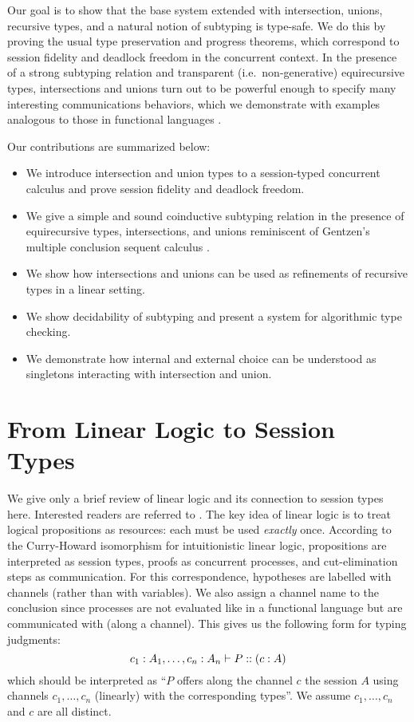 \documentclass[submission,copyright,creativecommons]{eptcs}
\begin{document}
Our goal is to show that the base system extended with intersection, unions, recursive types, and a natural notion of subtyping is type-safe. We do this by proving the usual type preservation and progress theorems, which correspond to session fidelity and deadlock freedom in the concurrent context. In the presence of a strong subtyping relation and transparent (i.e.\ non-generative)  equirecursive types, intersections and unions turn out to be powerful enough to specify many interesting communications behaviors, which we demonstrate with examples analogous to those in functional languages \cite{FreemanP91,Dunfield03}.

Our contributions are summarized below:
\begin{itemize}
  \item We introduce intersection and union types to a session-typed concurrent calculus and prove session fidelity and deadlock freedom.
  \item We give a simple and sound coinductive subtyping relation in the presence of equirecursive types, intersections, and unions reminiscent of Gentzen's multiple conclusion sequent calculus \cite{Gentzen35, Girard87}.
  \item We show how intersections and unions can be used as refinements of recursive types in a linear setting.
  \item We show decidability of subtyping and present a system for algorithmic type checking.
  \item We demonstrate how internal and external choice can be understood as singletons interacting with intersection and union.
\end{itemize}


\section{From Linear Logic to Session Types}
\label{base}
We give only a brief review of linear logic and its connection to session types here. Interested readers are referred to \cite{CairesP10, PfenningG15, Honda93}. The key idea of linear logic is to treat logical propositions as resources: each must be used \emph{exactly} once. According to the Curry-Howard isomorphism for intuitionistic linear logic, propositions are interpreted as session types, proofs as concurrent processes, and cut-elimination steps as communication. For this correspondence, hypotheses are labelled with channels (rather than with variables). We also assign a channel name to the conclusion since processes are not evaluated like in a functional language but are communicated with (along a channel). This gives us the following form for typing judgments:
$$ c_1 : A_1, \ldots, c_n : A_n \vdash P :: (c : A)$$
which should be interpreted as ``$P$ offers along the channel $c$ the session $A$ using channels $c_1, \ldots, c_n$ (linearly) with the corresponding types''. We assume $c_1, \ldots, c_n$ and $c$ are all distinct.
\end{document}
